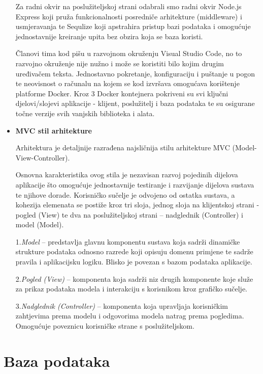 \begin{itemize}
Za radni okvir na poslužiteljskoj strani odabrali smo radni okvir Node.js Express koji pruža funkcionalnosti posredniče arhitekture (middleware) i usmjeravanja te Sequlize koji apstrahira pristup bazi podataka i omogućuje jednostavnije kreiranje upita bez obzira koja se baza koristi.

Članovi tima kod pišu u razvojnom okruženju Visual Studio Code, no to razvojno okruženje nije nužno i može se koristiti bilo kojim drugim uređivačem teksta. Jednostavno pokretanje, konfiguraciju i puštanje u pogon te neovisnost o računalu na kojem se kod izvršava omogućava korištenje platforme Docker. Kroz 3 Docker kontejnera pokriveni su svi ključni djelovi/slojevi aplikacije - klijent, poslužitelj i baza podataka te su osigurane točne verzije svih vanjskih biblioteka i alata.


		\item \textbf{MVC stil arhitekture}

Arhitektura je  detaljnije razrađena najsličnija stilu arhitekture MVC (Model-View-Controller).

Osnovna karakteristika ovog stila je nezavisan razvoj pojedinih dijelova aplikacije što omogućuje jednostavnije testiranje i razvijanje dijelova sustava te njihove dorade. Korisničko sučelje je odvojeno od ostatka sustava,  a kohezija elemenata se postiže kroz tri sloja, jednog sloja na klijentskoj strani - pogled (View) te dva na poslužiteljskoj strani – nadglednik (Controller) i model (Model).

1.\textit{Model} – predstavlja glavnu komponentu sustava koja sadrži dinamičke strukture podataka odnosno razrede koji opisuju domenu primjene te sadrže pravila i aplikacijsku logiku. Blisko je povezan s bazom podataka aplikacije.

2.\textit{Pogled (View)} – komponenta koja sadrži niz drugih komponente koje služe za prikaz podataka modela i interakciju s korisnikom kroz grafičko sučelje.

3.\textit{Nadglednik (Controller)}  – komponenta koja upravljaja korisničkim zahtjevima prema modelu i odgovorima modela natrag prema pogledima. Omogućuje poveznicu korisničke strane s poslužiteljskom.

	\end{itemize}

	
		

		

				
		\section{Baza podataka}
			
